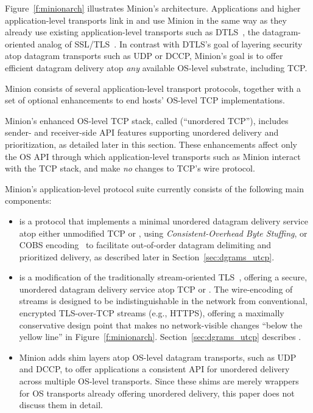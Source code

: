 Figure~\ref{f:minionarch} illustrates Minion's architecture.
Applications and higher application-level transports
link in and use Minion in the same way as they already use
existing application-level transports
such as DTLS~\cite{rfc4347},
the datagram-oriented analog of SSL/TLS~\cite{rfc5246}.
In contrast with DTLS's goal of layering security
atop datagram transports such as UDP or DCCP,
Minion's goal is to offer efficient datagram delivery
atop {\em any} available OS-level substrate, including TCP.

Minion consists of
several application-level transport protocols,
together with a set of optional enhancements
to end hosts' OS-level TCP implementations.

Minion's enhanced OS-level TCP stack,
called {\em \utcp} (``unordered TCP''),
includes sender- and receiver-side
API features supporting unordered delivery and prioritization,
as detailed later in this section.
These enhancements affect only the OS API
through which application-level transports such as Minion
interact with the TCP stack,
and make {\em no} changes to TCP's wire protocol.

Minion's application-level protocol suite currently consists
of the following main components:
\begin{itemize}
\item	{\bf \ucobs} is a protocol
	that implements a minimal unordered datagram delivery service
	atop either unmodified TCP or \utcp,
	using 
    {\em Consistent-Overhead Byte Stuffing}, or
    COBS encoding~\cite{cheshire97consistent}
	to facilitate out-of-order datagram delimiting
	and prioritized delivery,
	as described later in Section~\ref{sec:dgrams_utcp}.
\item	{\bf \utls} is a modification of
	the traditionally stream-oriented TLS~\cite{rfc5246},
	offering a secure, unordered datagram delivery service
	atop TCP or \utcp.
	The wire-encoding of \utls streams
	is designed to be indistinguishable in the network
	from conventional, encrypted TLS-over-TCP streams (e.g., HTTPS),
	offering a maximally conservative design point
	that makes no network-visible changes
	``below the yellow line''
	in Figure~\ref{f:minionarch}.
	Section~\ref{sec:dgrams_utcp} describes \utls.
\item	Minion adds shim layers
	atop OS-level datagram transports, such as UDP and DCCP,
	to offer applications a consistent API
	for unordered delivery across multiple OS-level transports.
	Since these shims are merely wrappers
	for OS transports already offering unordered delivery,
	this paper does not discuss them in detail.
\end{itemize}

